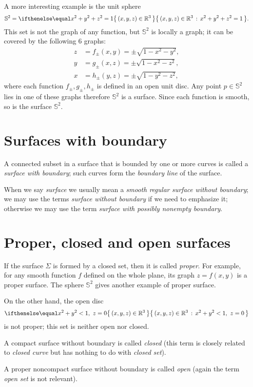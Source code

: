 A more interesting example is the unit sphere 
\[\mathbb{S}^2=\set{(x,y,z)\in\RR^3}{x^2+y^2+z^2=1}.\]
This set is not the graph of any function,
but $\mathbb{S}^2$ is locally a graph;
it can be covered by the following 6 graphs:
\begin{align*}
z&=f_\pm(x,y)=\pm \sqrt{1-x^2-y^2},
\\
y&=g_\pm(x,z)=\pm \sqrt{1-x^2-z^2},
\\
x&=h_\pm(y,z)=\pm \sqrt{1-y^2-z^2},
\end{align*}
where each function $f_\pm,g_\pm,h_\pm$ is defined in an open unit disc.
Any point $p\in\mathbb{S}^2$ lies in one of these graphs therefore $\mathbb{S}^2$ is a surface.
Since each function is smooth, so is the surface $\mathbb{S}^2$.

\section{Surfaces with boundary}
A connected subset in a surface that is bounded by one or more 
curves is called a  \emph{surface with boundary}; such curves form the \emph{boundary line} of the surface.

When we say {}\emph{surface} we usually mean a {}\emph{smooth regular surface without boundary};
we may use the terms {}\emph{surface without boundary} if we need to emphasize it;
otherwise we may use the term {}\emph{surface with possibly nonempty boundary}.

\section{Proper, closed and open surfaces}
If the surface $\Sigma$ is formed by a closed set, then it is called \emph{proper}.
For example, for any smooth function $f$ defined on the whole plane, its graph $z=f(x,y)$ is a proper surface.
The sphere $\mathbb{S}^2$ gives another example of proper surface.

On the other hand, the open disc 
\[\set{(x,y,z)\in\RR^3}{x^2+y^2<1,\  z=0}\]
is not proper; this set is neither open nor closed.

A compact surface without boundary is called \emph{closed}
(this term is closely related to {}\emph{closed curve} but has nothing to do with {}\emph{closed set}).

A proper noncompact surface without boundary is called \emph{open} (again the term {}\emph{open set} is not relevant).

